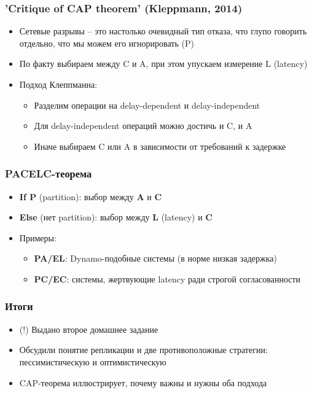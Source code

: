 \documentclass{beamer}
\begin{document}
\begin{frame}
\frametitle{'Critique of CAP theorem' (Kleppmann, 2014)}

\begin{itemize}
  \item Сетевые разрывы – это настолько очевидный тип отказа, что глупо говорить отдельно, что мы можем его игнорировать (P)
  \item По факту выбираем между C и A, при этом упускаем измерение L (latency)
  \item Подход Клеппманна:
  \begin{itemize}
    \item Разделим операции на delay-dependent и delay-independent
    \item Для delay-independent операций можно достичь и C, и A
    \item Иначе выбираем C или A в зависимости от требований к задержке
  \end{itemize}
\end{itemize}

\end{frame}

\begin{frame}
\frametitle{PACELC-теорема}

\begin{itemize}
  \item \textbf{If P} (partition): выбор между \textbf{A} и \textbf{C}
  \item \textbf{Else} (нет partition): выбор между \textbf{L} (latency) и \textbf{C}
  \item Примеры:
  \begin{itemize}
    \item \textbf{PA/EL}: Dynamo-подобные системы (в норме низкая задержка)
    \item \textbf{PC/EC}: системы, жертвующие latency ради строгой согласованности
  \end{itemize}
\end{itemize}

\end{frame}

\begin{frame}
\frametitle{Итоги}

\begin{itemize}
  \item (!) Выдано второе домашнее задание
  \item Обсудили понятие репликации и две противоположные стратегии: пессимистическую и оптимистическую
  \item CAP-теорема иллюстрирует, почему важны и нужны оба подхода
\end{itemize}

\end{frame}
\end{document}
